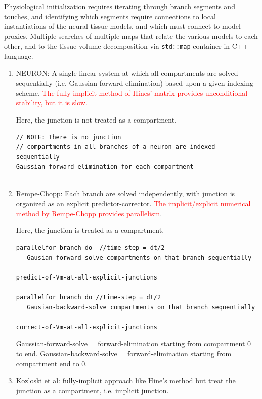 Physiological initialization requires iterating through branch segments and
touches, and identifying which segments require connections to local
instantiations of the neural tissue models, and which must connect to model
proxies. Multiple searches of multiple maps that
relate the various models to each other, and to the tissue volume
decomposition via \verb!std::map! container in C++ language.

\begin{enumerate}
  \item NEURON: A single linear system at which all compartments are solved
  sequentially (i.e. Gaussian forward elimination) based upon a given indexing
  scheme.  \textcolor{red}{The fully implicit method of Hines' matrix provides
  unconditional stability, but it is slow.}
  
  Here, the junction is not treated as a compartment.
\begin{verbatim}
// NOTE: There is no junction
// compartments in all branches of a neuron are indexed sequentially
Gaussian forward elimination for each compartment 
  
\end{verbatim}  
  
  \item Rempe-Chopp: Each branch are solved independently, with junction is
  organized as an explicit predictor-corrector.
   \textcolor{red}{The implicit/explicit numerical method by Rempe-Chopp
   provides parallelism}.
  
 Here, the junction is treated as a compartment. 
   
\begin{verbatim}
parallelfor branch do  //time-step = dt/2 
   Gausian-forward-solve compartments on that branch sequentially
   
predict-of-Vm-at-all-explicit-junctions

parallelfor branch do //time-step = dt/2
   Gausian-backward-solve compartments on that branch sequentially

correct-of-Vm-at-all-explicit-junctions   
\end{verbatim}
Gaussian-forward-solve = forward-elimination starting from compartment 0 to end.
Gaussian-backward-solve = forward-elimination starting from compartment end to
0.

   \item Kozloski et al: fully-implicit approach like Hine's method but 
   treat the junction as a compartment, i.e. implicit junction.


\end{enumerate}

